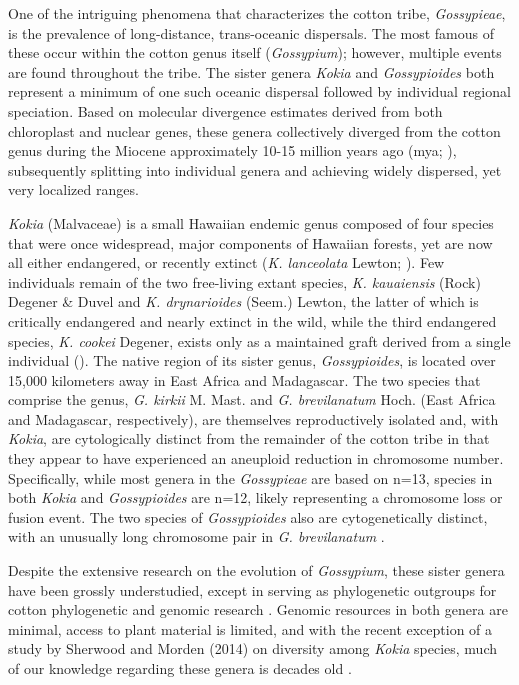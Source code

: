 \documentclass[10pt,letterpaper]{article}
\begin{document}
One of the intriguing phenomena that characterizes the cotton tribe, \textit{Gossypieae},
is the prevalence of long-distance, trans-oceanic dispersals. The most famous of
these occur within the cotton genus itself (\textit{Gossypium}); however, multiple events
are found throughout the tribe\cite{Dejoode1992, Fryxell1979, Stephens1958,
  Stephens1966, Wendel1989, Wendel1992, Wendel1990, Wendel1990b, Wendel2003,
  Seelanan1997}. The sister genera \textit{Kokia} and \textit{Gossypioides} both represent a
minimum of one such oceanic dispersal followed by individual regional
speciation. Based on molecular divergence estimates derived from both
chloroplast and nuclear genes, these genera collectively diverged from the
cotton genus during the Miocene approximately 10-15 million years ago (mya;
\cite{Seelanan1997, Cronn2002}), subsequently splitting into individual genera
and achieving widely dispersed, yet very localized ranges.

\textit{Kokia} (Malvaceae) is a small Hawaiian endemic genus composed of four species
that were once widespread, major components of Hawaiian forests, yet are now all
either endangered, or recently extinct (\textit{K. lanceolata} Lewton; \cite{Bates1990,
  Sherwood2014}). Few individuals remain of the two free-living extant species,
\textit{K. kauaiensis} (Rock) Degener \& Duvel and \textit{K. drynarioides} (Seem.) Lewton, the
latter of which is critically endangered and nearly extinct in the wild, while
the third endangered species,\textit{ K. cookei} Degener, exists only as a maintained
graft derived from a single individual (\cite{Service2012, Sherwood2014}). The
native region of its sister genus, \textit{Gossypioides}, is located over 15,000
kilometers away in East Africa and Madagascar. The two species that comprise the
genus, \textit{G. kirkii } M. Mast. and \textit{G. brevilanatum} Hoch. (East Africa and Madagascar,
respectively), are themselves reproductively isolated and, with \textit{Kokia}, are
cytologically distinct from the remainder of the cotton tribe in that they
appear to have experienced an aneuploid reduction in chromosome number.
Specifically, while most genera in the \textit{Gossypieae} are based on n=13, species in
both \textit{Kokia} and \textit{Gossypioides} are n=12, likely representing a chromosome loss or
fusion event. The two species of \textit{Gossypioides} also are cytogenetically distinct,
with an unusually long chromosome pair in \textit{G. brevilanatum} \cite{Hutchinson1937,
  Hutchinson1943}.

Despite the extensive research on the evolution of \textit{Gossypium}, these sister
genera have been grossly understudied, except in serving as phylogenetic
outgroups for cotton phylogenetic and genomic research \cite{Seelanan1997,
  Cronn2002}. Genomic resources in both genera are minimal, access to plant
material is limited, and with the recent exception of a study by Sherwood and
Morden (2014) on diversity among \textit{Kokia} species, much of our knowledge regarding
these genera is decades old \cite{Hutchinson1947, Seelanan1997, Fryxell1968}.
\end{document}
